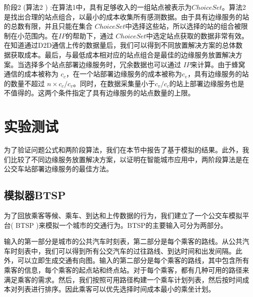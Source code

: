 
阶段2 (算法2 ) :在算法1中，具有足够收入的一组站点被表示为$ChoiceSet$。算法2是找出合理的站点组合，以最小的成本收集所有感测数据。由于具有边缘服务的站的总数有限，并且只能在集合 $ChoiceSet$中选择这些站，所以选择的站的组合被限制在小范围内。在$IP$的帮助下，通过 $ChoiceSet$中选定站点获取的数据非常有效。在知道通过D2D通信上传的数据量后，我们可以得到不同放置解决方案的总体数据获取成本。最后，与最低成本相对应的站点组合是最佳的边缘服务放置解决方案。当选择多个站点部署边缘服务时，冗余数据也可以通过 $IP$来计算。由于蜂窝通信的成本被称为 $c_c$，在一个站部署边缘服务的成本被称为$c_v$，具有边缘服务的站的数量不超过 $n\times c_c / c_v$。同时，在数据采集量小于$c_v/c_c$的站上部署边缘服务也是不值得的。这两个条件指定了具有边缘服务的站点数量的上限。

\section{实验测试}

为了验证问题公式和两阶段算法，我们在本节中报告了基于模拟的结果。此外，我们比较了不同边缘服务放置解决方案，以证明在智能城市应用中，两阶段算法是在公交车站部署边缘服务的最佳方法。

\subsection{模拟器BTSP}


为了回放乘客等候、乘车、到达和上传数据的行为，我们建立了一个公交车模拟平台( BTSP )来模拟一个城市的交通行为。BTSP的主要输入可分为两部分。

输入的第一部分是城市的公共汽车时刻表，第二部分是每个乘客的路线。从公共汽车时刻表中，我们可以得到所有公交汽车的过往路线、到达时间和出发间隔。此外，可以立即生成交通有向图。输入的第二部分是每个乘客的路线，其中包含所有乘客的信息，每个乘客的起点站和终点站。对于每个乘客，都有几种可用的路径来满足乘客的需求。然后，我们按照可用路径构建一个乘车计划列表，然后按时间成本对列表进行排序。因此乘客可以优先选择时间成本最小的乘坐计划。

